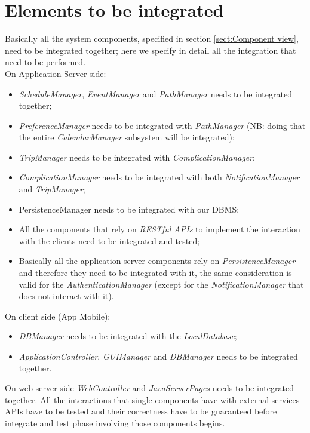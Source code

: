 \section{Elements to be integrated}
Basically all the system components, specified in section \ref{sect:Component view}, need to be integrated together; here we specify in detail all the integration that need to be performed.\\
On Application Server side:
\begin{itemize}
	\item \textit{ScheduleManager}, \textit{EventManager} and \textit{PathManager} needs to be integrated together;
	\item \textit{PreferenceManager} needs to be integrated with \textit{PathManager} (NB: doing that the entire \textit{CalendarManager} subsystem will be integrated);
	\item \textit{TripManager} needs to be integrated with \textit{ComplicationManager};
	\item \textit{ComplicationManager} needs to be integrated with both \textit{NotificationManager} and \textit{TripManager};
	\item PersistenceManager needs to be integrated with our DBMS;
	\item All the components that rely on \textit{RESTful APIs} to implement the interaction with the clients need to be integrated and tested;
	\item Basically all the application server components rely on \textit{PersistenceManager} and therefore they need to be integrated with it, the same consideration is valid for the \textit{AuthenticationManager} (except for the \textit{NotificationManager} that does not interact with it).
\end{itemize}
On client side (App Mobile):
\begin{itemize}
	\item \textit{DBManager} needs to be integrated with the \textit{LocalDatabase};
	\item \textit{ApplicationController}, \textit{GUIManager} and \textit{DBManager} needs to be integrated together.
\end{itemize}
On web server side \textit{WebController} and \textit{JavaServerPages} needs to be integrated together.
All the interactions that single components have with external services APIs have to be tested and their correctness have to be guaranteed before integrate and test phase involving those components begins.

